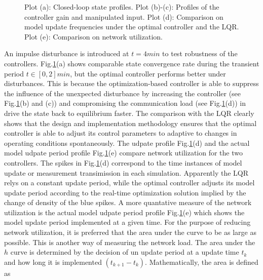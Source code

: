 \documentclass[letterpaper, 10 pt, conference]{ieeeconf}\IEEEoverridecommandlockouts%
\begin{document}
\begin{figure}[hptb]
  \centerline{\hspace{2mm}\hspace{-4mm}{\footnotesize (a)}
  \hspace{-4mm}{\footnotesize (b)}}
  \centerline{\hspace{2mm}\hspace{-4mm}{\footnotesize (c)}
  \hspace{-4mm}{\footnotesize (d)}}
  \centerline{\hspace{2mm}\hspace{-4mm}{\footnotesize (e)}}
  \caption{Plot (a): Closed-loop state profiles. Plot (b)-(c): Profiles of the controller gain and manipulated input. Plot (d): Comparison on model update frequencies under the optimal controller and the LQR. Plot (e): Comparison on network utilization. }\label{fig:CSTRPerformance}
\end{figure}

An impulse disturbance is introduced at $t = 4min$ to test robustness of the controllers. Fig.\ref{fig:CSTRPerformance}(a) shows comparable state convergence rate during the transient period $t \in [0,2]min$, but the optimal controller performs better under disturbances. This is because the optimization-based controller is able to suppress the influence of the unexpected disturbance by increasing the controller (see Fig.\ref{fig:CSTRPerformance}(b) and (c)) and compromising the communication load (see Fig.\ref{fig:CSTRPerformance}(d)) in drive the state back to equilibrium faster. The comparison with the LQR clearly shows that the design and implementation methodology ensures that the optimal controller is able to adjust its control parameters to adaptive to changes in operating conditions spontaneously. The udpate profile Fig.\ref{fig:CSTRPerformance}(d) and the actual model udpate period profile Fig.\ref{fig:CSTRPerformance}(e) compare network utilization for the two controllers. The spikes in Fig.\ref{fig:CSTRPerformance}(d) correspond to the time instances of model update or measurement transimission in each simulation. Apparently the LQR relys on a constant update period, while the optimal controller adjusts its model update period according to the real-time optimization solution implied by the change of density of the blue spikes. A more quantative measure of the network utilization is the actual model udpate period profile Fig.\ref{fig:CSTRPerformance}(e) which shows the model update period implemented at a given time. For the purpose of reducing network utilization, it is preferred that the area under the curve to be as large as possible. This is another way of measuring the network load. The area under the $h$ curve is determined by the decision of un update period at a update time $t_k$ and how long it is implemented $(t_{k+1} - t_k)$. Mathematically, the area is defined as
\end{document}
